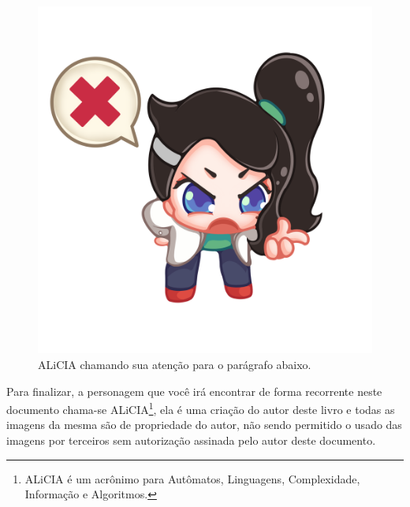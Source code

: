 \begin{figure}[H]
	\centering
	\includegraphics[scale=0.3]{fig/Alicia-C.png}
	\caption{ALiCIA chamando sua atenção para o parágrafo abaixo.}
\end{figure}

Para finalizar, a personagem que você irá encontrar de forma recorrente neste documento chama-se ALiCIA\footnote{ALiCIA é um acrônimo para Autômatos, Linguagens, Complexidade, Informação e Algoritmos.}, ela é uma criação do autor deste livro e todas as imagens da mesma são de propriedade do autor, não sendo permitido o usado das imagens por terceiros sem autorização assinada pelo autor deste documento.

\endgroup
\newpage
